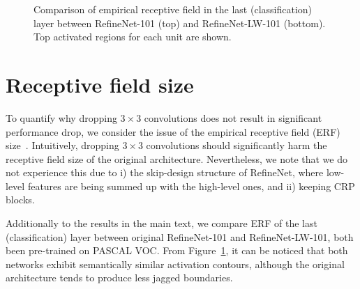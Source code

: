 \documentclass{bmvc2k}
\begin{document}
				\begin{figure}[hbt]
					\centering
						\vskip 0.1in
						\caption{Comparison of empirical receptive field in the last (classification) layer between RefineNet-101 (top) and RefineNet-LW-101 (bottom). Top activated regions for each unit are shown.}
						\label{fig:erf2}
					\end{figure}
					
					\section{Receptive field size}
					\label{ss:erf}
					To quantify why dropping $3\times3$ convolutions does not result in significant performance drop, we consider the issue of the empirical receptive field (ERF) size~\cite{ZhouKLOT14}. Intuitively, dropping $3\times3$ convolutions should significantly harm the receptive field size of the original architecture. Nevertheless, we note that we do not experience this due to i) the skip-design structure of RefineNet, where low-level features are being summed up with the high-level ones, and ii) keeping CRP blocks.
					
					
					Additionally to the results in the main text, we compare ERF of the last (classification) layer between original RefineNet-101 and RefineNet-LW-101, both been pre-trained on PASCAL VOC. From Figure~\ref{fig:erf2}, it can be noticed that both networks exhibit semantically similar activation contours, although the original architecture tends to produce less jagged boundaries.
\end{document}
